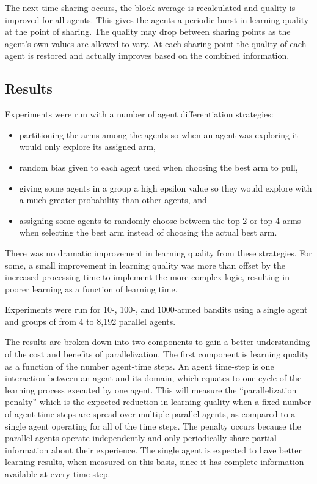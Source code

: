 \documentclass[11pt]{article} %
\begin{document}
\begin{flushleft}
The next time sharing occurs, the block average is recalculated and quality is improved for all agents.  This gives the agents a periodic burst in learning quality at the point of sharing.  The quality may drop between sharing points as the agent’s own values are allowed to vary.  At each sharing point the quality of each agent is restored and actually improves based on the combined information.

\subsection{Results}
Experiments were run with a number of agent differentiation strategies:
\begin{itemize}
\item
partitioning the arms among the agents so when an agent was exploring it would only explore its assigned arm,
\item
random bias given to each agent used when choosing the best arm to pull,
\item
giving some agents in a group a high epsilon value so they would explore with a much greater probability than other agents, and
\item
assigning some agents to randomly choose between the top 2 or top 4 arms when selecting the best arm instead of choosing the actual best arm.
\end{itemize}

There was no dramatic improvement in learning quality from these strategies.  For some, a small improvement in learning quality was more than offset by the increased processing time to implement the more complex logic, resulting in poorer learning as a function of learning time.

Experiments were run for 10-, 100-, and 1000-armed bandits using a single agent and groups of from 4 to 8,192 parallel agents.

The results are broken down into two components to gain a better understanding of the cost and benefits of parallelization.  The first component is learning quality as a function of the number agent-time steps.  An agent time-step is one interaction between an agent and its domain, which equates to one cycle of the learning process executed by one agent.  This will measure the “parallelization penalty” which is the expected reduction in learning quality when a fixed number of agent-time steps are spread over multiple parallel agents, as compared to a single agent operating for all of the time steps.  The penalty occurs because the parallel agents operate independently and only periodically share partial information about their experience.  The single agent is expected to have better learning results, when measured on this basis, since it has complete information available at every time step.


\end{flushleft}
\end{document}
